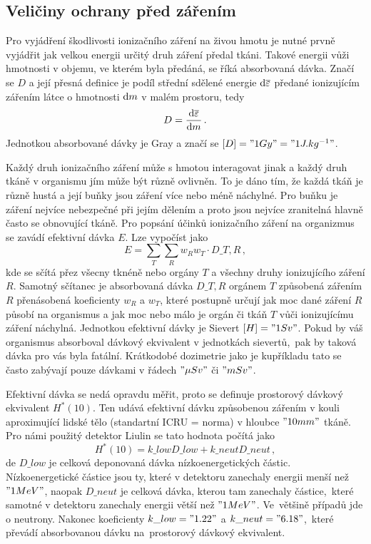 \documentclass[12pt,a4paper]{article}
\begin{document}
\subsection*{Veličiny ochrany před zářením}
Pro vyjádření škodlivosti ionizačního záření na živou hmotu je nutné
prvně vyjádřit jak velkou energii určitý druh záření předal tkáni.
Takové energii vůži hmotnosti v objemu, ve kterém byla předáná, se říká
absorbovaná dávka. Značí se $ D $ a její přesná definice je podíl střední
sdělené energie $\mathrm{d} \overline{\varepsilon}$ předané ionizujícím zářením
látce o hmotnosti $\mathrm{d} m$ v malém prostoru, tedy
$$D=\frac{\mathrm{d} \overline{\varepsilon}}{\mathrm{d} m}\,.$$
Jednotkou absorbované dávky je Gray a značí se ${[D]="1 Gy"="1 J.kg^{-1}"}$.\par
Každý druh ionizačního záření může s hmotou interagovat jinak a každý druh tkáně
v organismu jím může být různě ovlivněn. To je dáno tím, že každá tkáň je různě
hustá a její buňky jsou záření více nebo méně náchylné. Pro buňku je záření
nejvíce nebezpečné při jejím dělením a proto jsou nejvíce zranitelná hlavně
často se obnovující tkáně. Pro popsání účinků ionizačního záření na organizmus
se zavádí efektivní dávka $E$. Lze vypočíst jako
$$E=\sum_{T}\sum_{R} w_R w_T\cdot D\_{T,R}\,,$$
kde se sčítá přez všecny tknéně nebo orgány $T$ a všechny druhy ionizujícího
záření $R$. Samotný sčítanec je absorbovaná dávka $D\_{T,R}$ orgánem $T$
způsobená zářením $R$ přenásobená koeficienty $w_R$ a $w_T$, které postupně
určují jak moc dané záření $R$ působí na organismus a jak moc nebo málo je
orgán či tkáň $T$ vůči ionizujícímu záření náchylná. Jednotkou efektivní dávky
je Sievert ${[H]="1 Sv"}$. Pokud by váš organismus absorboval dávkový ekvivalent
v jednotkách sievertů,~pak by taková dávka pro vás byla fatální. Krátkodobé
dozimetrie jako je kupříkladu tato se často zabývají pouze dávkami v řádech
$ "\mu Sv" $ či $ "mSv" $.\par
Efektivní dávka se nedá opravdu měřit, proto se definuje prostorový dávkový
ekvivalent $ H^\ast(10) $. Ten udává efektivní dávku způsobenou zářením v kouli
aproximující lidské tělo (standartní ICRU = norma) v hloubce $"10 mm"$ tkáně.
Pro námi použitý detektor Liulin se tato hodnota počítá jako
$$H^\ast(10)=k\_{low}D\_{low}+k\_{neut}D\_{neut}\,,$$
de $D\_{low}$ je celková deponovaná dávka nízkoenergetických částic.
Nízkoenergetické částice jsou ty, které v detektoru zanechaly energii menší než
$ "1 MeV" $, naopak $ D\_{neut} $ je celková dávka, kterou tam zanechaly
částice,~které samotné v detektoru zanechaly energii větší než $ "1 MeV" $.
Ve~většině případů jde o neutrony. Nakonec koeficienty
$ k\_{low}="1.22" $ a $ k\_{neut}="6.18" $,~které převádí absorbovanou dávku
na~prostorový dávkový ekvivalent.\par
\end{document}
